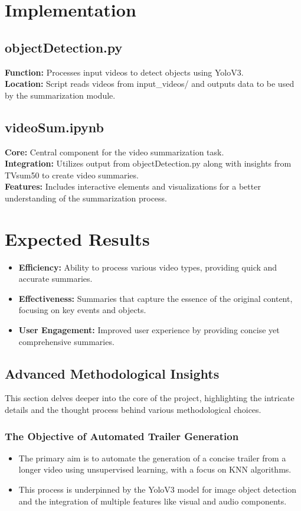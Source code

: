 \documentclass[conference]{IEEEtran}
\begin{document}
\section*{Implementation}
\subsection*{objectDetection.py}
\textbf{Function:} Processes input videos to detect objects using YoloV3.\\
\textbf{Location:} Script reads videos from input\_videos/ and outputs data to be used by the summarization module.

\subsection*{videoSum.ipynb}
\textbf{Core:} Central component for the video summarization task.\\
\textbf{Integration:} Utilizes output from objectDetection.py along with insights from TVsum50 to create video summaries.\\
\textbf{Features:} Includes interactive elements and visualizations for a better understanding of the summarization process.

\section*{Expected Results}
\begin{itemize}
    \item \textbf{Efficiency:} Ability to process various video types, providing quick and accurate summaries.
    \item \textbf{Effectiveness:} Summaries that capture the essence of the original content, focusing on key events and objects.
    \item \textbf{User Engagement:} Improved user experience by providing concise yet comprehensive summaries.
\end{itemize}


\subsection*{Advanced Methodological Insights}

This section delves deeper into the core of the project, highlighting the intricate details and the thought process behind various methodological choices.

\subsubsection*{The Objective of Automated Trailer Generation}
\begin{itemize}
    \item The primary aim is to automate the generation of a concise trailer from a longer video using unsupervised learning, with a focus on KNN algorithms.
    \item This process is underpinned by the YoloV3 model for image object detection and the integration of multiple features like visual and audio components.
\end{itemize}
\end{document}

